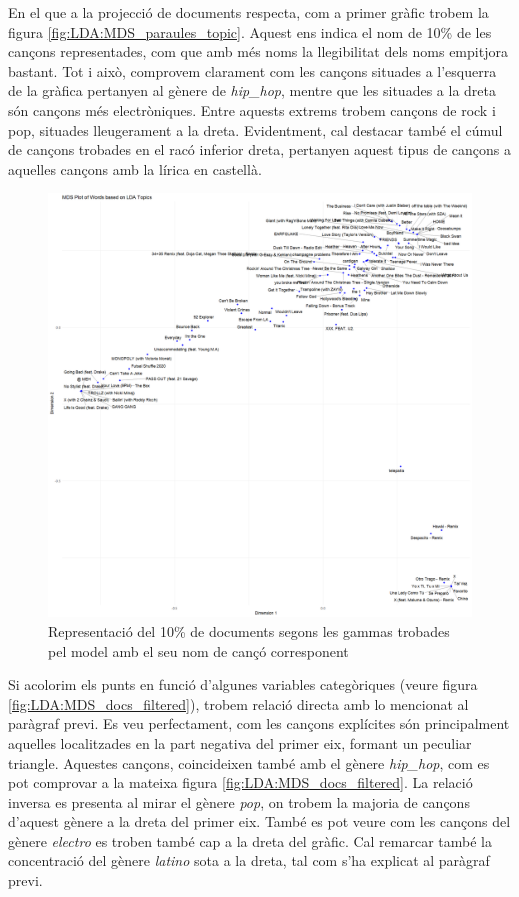 En el que a la projecció de documents respecta, com a primer gràfic trobem la figura \ref{fig:LDA:MDS_paraules_topic}. Aquest ens indica el nom de 10\% de les cançons representades, com que amb més noms la llegibilitat dels noms empitjora bastant. Tot i això, comprovem clarament com les cançons situades a l'esquerra de la gràfica pertanyen al gènere de \textit{hip\_hop}, mentre que les situades a la dreta són cançons més electròniques. Entre aquests extrems trobem cançons de rock i pop, situades lleugerament a la dreta. Evidentment, cal destacar també el cúmul de cançons trobades en el racó inferior dreta, pertanyen aquest tipus de cançons a aquelles cançons amb la lírica en castellà. 

\begin{figure}[H]
    \centering
    \includegraphics[width=0.95\linewidth]{Images/8_Textual/LDA/MDS_docs_10percnt.png}
    \caption{Representació del 10\% de documents segons les gammas trobades pel model amb el seu nom de cançó corresponent}
    \label{fig:LDA:MDS_docs_10percnt}
\end{figure}

Si acolorim els punts en funció d'algunes variables categòriques (veure figura \ref{fig:LDA:MDS_docs_filtered}), trobem relació directa amb lo mencionat al paràgraf previ. Es veu perfectament, com les cançons explícites són principalment aquelles localitzades en la part negativa del primer eix, formant un peculiar triangle. Aquestes cançons, coincideixen també amb el gènere \textit{hip\_hop}, com es pot comprovar a la mateixa figura \ref{fig:LDA:MDS_docs_filtered}. La relació inversa es presenta al mirar el gènere \textit{pop}, on trobem la majoria de cançons d'aquest gènere a la dreta del primer eix. També es pot veure com les cançons del gènere \textit{electro} es troben també cap a la dreta del gràfic. Cal remarcar també la concentració del gènere \textit{latino} sota a la dreta, tal com s'ha explicat al paràgraf previ. 

